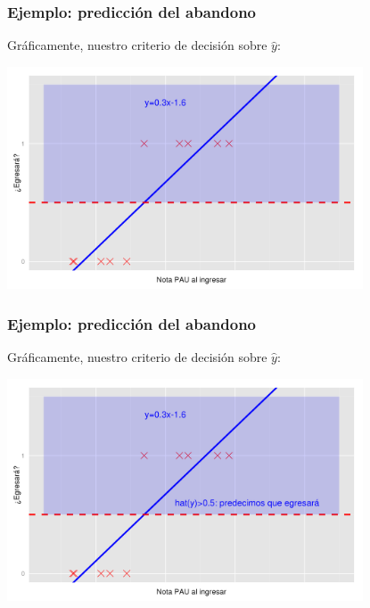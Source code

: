 \documentclass{beamer}
\begin{document}
 \begin{frame}\frametitle{Ejemplo: predicción del abandono}
   \begin{overlayarea}{\textwidth}{0.6cm}  
   Gráficamente, nuestro criterio de decisión sobre $\hat{y}$: 
 \end{overlayarea}
 \begin{center}
  \includegraphics[height=6.6cm]{egresara5.png}
\end{center}
  \end{frame}
  
 \begin{frame}\frametitle{Ejemplo: predicción del abandono}
   \begin{overlayarea}{\textwidth}{0.6cm}  
   Gráficamente, nuestro criterio de decisión sobre $\hat{y}$:
 \end{overlayarea}
 \begin{center}
  \includegraphics[height=6.6cm]{egresara6.png}
\end{center}
  \end{frame}
  
\end{document}

